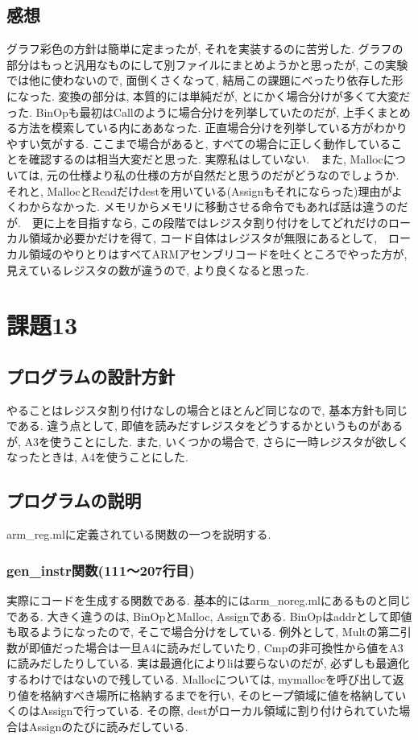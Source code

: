 \documentclass{jarticle}
\begin{document}
\subsection{感想}
グラフ彩色の方針は簡単に定まったが, それを実装するのに苦労した. グラフの部分はもっと汎用なものにして別ファイルにまとめようかと思ったが, この実験では他に使わないので, 面倒くさくなって, 結局この課題にべったり依存した形になった. 変換の部分は, 本質的には単純だが, とにかく場合分けが多くて大変だった. BinOpも最初はCallのように場合分けを列挙していたのだが, 上手くまとめる方法を模索している内にああなった. 正直場合分けを列挙している方がわかりやすい気がする. ここまで場合があると, すべての場合に正しく動作していることを確認するのは相当大変だと思った. 実際私はしていない.　また, Mallocについては, 元の仕様より私の仕様の方が自然だと思うのだがどうなのでしょうか. それと, MallocとReadだけdestを用いている(Assignもそれにならった)理由がよくわからなかった. メモリからメモリに移動させる命令でもあれば話は違うのだが.　更に上を目指すなら, この段階ではレジスタ割り付けをしてどれだけのローカル領域か必要かだけを得て, コード自体はレジスタが無限にあるとして,　ローカル領域のやりとりはすべてARMアセンブリコードを吐くところでやった方が, 見えているレジスタの数が違うので, より良くなると思った.


\section{課題13}
\subsection{プログラムの設計方針}
やることはレジスタ割り付けなしの場合とほとんど同じなので, 基本方針も同じである. 違う点として, 即値を読みだすレジスタをどうするかというものがあるが, A3を使うことにした. また, いくつかの場合で, さらに一時レジスタが欲しくなったときは, A4を使うことにした.
\subsection{プログラムの説明}
arm\_reg.mlに定義されている関数の一つを説明する.
\subsubsection{gen\_instr関数(111〜207行目)}
実際にコードを生成する関数である. 基本的にはarm\_noreg.mlにあるものと同じである. 大きく違うのは, BinOpとMalloc, Assignである. BinOpはaddrとして即値も取るようになったので, そこで場合分けをしている. 例外として, Multの第二引数が即値だった場合は一旦A4に読みだしていたり, Cmpの非可換性から値をA3に読みだしたりしている. 実は最適化によりliは要らないのだが, 必ずしも最適化するわけではないので残している. Mallocについては, mymallocを呼び出して返り値を格納すべき場所に格納するまでを行い, そのヒープ領域に値を格納していくのはAssignで行っている. その際, destがローカル領域に割り付けられていた場合はAssignのたびに読みだしている.
\end{document}
